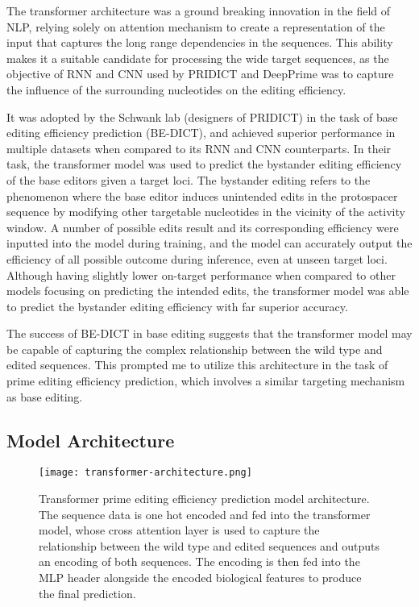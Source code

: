The transformer architecture was a ground breaking innovation in the field of NLP, relying solely on attention mechanism to create a representation of the input that captures the long range dependencies in the sequences\cite{vaswaniAttentionAllYou2017}. This ability makes it a suitable candidate for processing the wide target sequences, as the objective of RNN and CNN used by PRIDICT and DeepPrime was to capture the influence of the surrounding nucleotides on the editing efficiency.

It was adopted by the Schwank lab (designers of PRIDICT) in the task of base editing efficiency prediction (BE-DICT), and achieved superior performance in multiple datasets when compared to its RNN and CNN counterparts\cite{marquartPredictingBaseEditing2021}. In their task, the transformer model was used to predict the bystander editing efficiency of the base editors given a target loci. The bystander editing refers to the phenomenon where the base editor induces unintended edits in the protospacer sequence by modifying other targetable nucleotides in the vicinity of the activity window. A number of possible edits result and its corresponding efficiency were inputted into the model during training, and the model can accurately output the efficiency of all possible outcome during inference, even at unseen target loci. Although having slightly lower on-target performance when compared to other models focusing on predicting the intended edits, the transformer model was able to predict the bystander editing efficiency with far superior accuracy.

The success of BE-DICT in base editing suggests that the transformer model may be capable of capturing the complex relationship between the wild type and edited sequences. This prompted me to utilize this architecture in the task of prime editing efficiency prediction, which involves a similar targeting mechanism as base editing.

\subsection{Model Architecture}

\begin{figure}
    \centering
    \texttt{[image: transformer-architecture.png]}
    \caption[Transformer Model Architecture]{Transformer prime editing efficiency prediction model architecture. The sequence data is one hot encoded and fed into the transformer model, whose cross attention layer is used to capture the relationship between the wild type and edited sequences and outputs an encoding of both sequences. The encoding is then fed into the MLP header alongside the encoded biological features to produce the final prediction.}
    \label{fig:transformer-model}
\end{figure}

